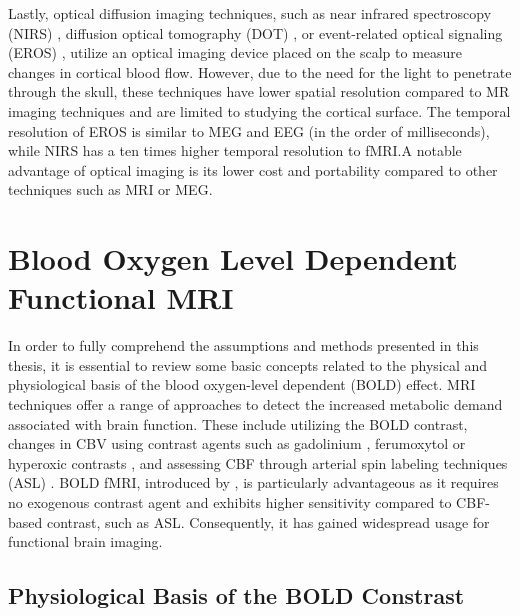 Lastly, optical diffusion imaging techniques, such as near infrared spectroscopy
(NIRS)
\citep{Kleinschmidt1996SimultaneousRecordingCerebral,Villringer1993infraredspectroscopyNIRS},
diffusion optical tomography (DOT) \citep{White2010Quantitativeevaluationhigh},
or event-related optical signaling (EROS)
\citep{Gratton2001eventrelatedoptical,Gratton1997FastLocalizedEvent}, utilize an
optical imaging device placed on the scalp to measure changes in cortical blood
flow. However, due to the need for the light to penetrate through the skull,
these techniques have lower spatial resolution compared to MR imaging techniques
and are limited to studying the cortical surface. The temporal resolution of
EROS is similar to MEG and EEG (in the order
of milliseconds), while NIRS has a ten times higher temporal
resolution to fMRI.A notable advantage of optical imaging is its lower cost and
portability compared to other techniques such as MRI or MEG.

\section{Blood Oxygen Level Dependent Functional MRI}

In order to fully comprehend the assumptions and methods presented in this
thesis, it is essential to review some basic concepts related to the physical
and physiological basis of the blood oxygen-level dependent (BOLD) effect. MRI
techniques offer a range of approaches to detect the increased metabolic demand
associated with brain function. These include utilizing the BOLD contrast,
changes in CBV using contrast agents such as gadolinium
\citep{Dean1992CerebralHA}, ferumoxytol
\citep{Christen2012Highresolutioncerebral} or hyperoxic contrasts
\citep{Bulte2007Measurementcerebralblood}, and assessing CBF through
arterial spin labeling techniques (ASL)
\citep{Buxton2009IntroductionFunctionalMagnetic}. BOLD fMRI, introduced by
\cite{Ogawa1990Brainmagneticresonance,Ogawa1992Intrinsicsignalchanges}, is
particularly advantageous as it requires no exogenous contrast agent and
exhibits higher sensitivity compared to CBF-based contrast, such as ASL.
Consequently, it has gained widespread usage for functional brain imaging.

\subsection{Physiological Basis of the BOLD Constrast}

